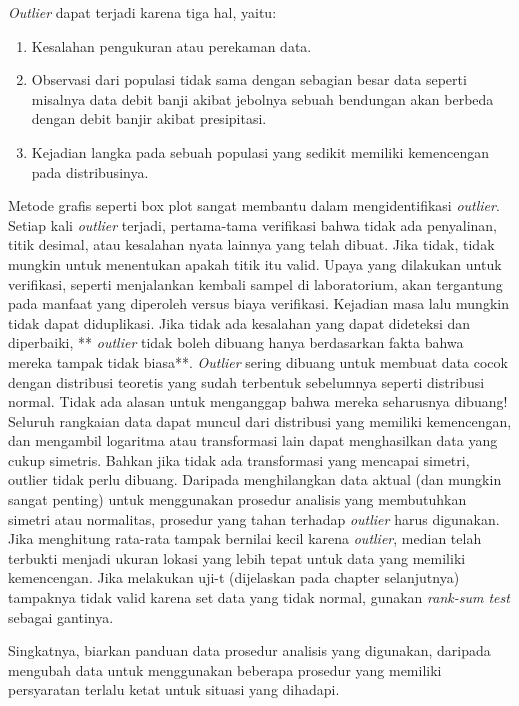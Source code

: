 \documentclass[]{book}
\providecommand{\tightlist}{%
  \setlength{\itemsep}{0pt}\setlength{\parskip}{0pt}}
\begin{document}
\emph{Outlier} dapat terjadi karena tiga hal, yaitu:

\begin{enumerate}
\def\labelenumi{\arabic{enumi}.}
\tightlist
\item
  Kesalahan pengukuran atau perekaman data.
\item
  Observasi dari populasi tidak sama dengan sebagian besar data seperti
  misalnya data debit banji akibat jebolnya sebuah bendungan akan
  berbeda dengan debit banjir akibat presipitasi.
\item
  Kejadian langka pada sebuah populasi yang sedikit memiliki kemencengan
  pada distribusinya.
\end{enumerate}

Metode grafis seperti box plot sangat membantu dalam mengidentifikasi
\emph{outlier}. Setiap kali \emph{outlier} terjadi, pertama-tama
verifikasi bahwa tidak ada penyalinan, titik desimal, atau kesalahan
nyata lainnya yang telah dibuat. Jika tidak, tidak mungkin untuk
menentukan apakah titik itu valid. Upaya yang dilakukan untuk
verifikasi, seperti menjalankan kembali sampel di laboratorium, akan
tergantung pada manfaat yang diperoleh versus biaya verifikasi. Kejadian
masa lalu mungkin tidak dapat diduplikasi. Jika tidak ada kesalahan yang
dapat dideteksi dan diperbaiki, ** \emph{outlier} tidak boleh dibuang
hanya berdasarkan fakta bahwa mereka tampak tidak biasa**.
\emph{Outlier} sering dibuang untuk membuat data cocok dengan distribusi
teoretis yang sudah terbentuk sebelumnya seperti distribusi normal.
Tidak ada alasan untuk menganggap bahwa mereka seharusnya dibuang!
Seluruh rangkaian data dapat muncul dari distribusi yang memiliki
kemencengan, dan mengambil logaritma atau transformasi lain dapat
menghasilkan data yang cukup simetris. Bahkan jika tidak ada
transformasi yang mencapai simetri, outlier tidak perlu dibuang.
Daripada menghilangkan data aktual (dan mungkin sangat penting) untuk
menggunakan prosedur analisis yang membutuhkan simetri atau normalitas,
prosedur yang tahan terhadap \emph{outlier} harus digunakan. Jika
menghitung rata-rata tampak bernilai kecil karena \emph{outlier}, median
telah terbukti menjadi ukuran lokasi yang lebih tepat untuk data yang
memiliki kemencengan. Jika melakukan uji-t (dijelaskan pada chapter
selanjutnya) tampaknya tidak valid karena set data yang tidak normal,
gunakan \emph{rank-sum test} sebagai gantinya.

Singkatnya, biarkan panduan data prosedur analisis yang digunakan,
daripada mengubah data untuk menggunakan beberapa prosedur yang memiliki
persyaratan terlalu ketat untuk situasi yang dihadapi.
\end{document}

